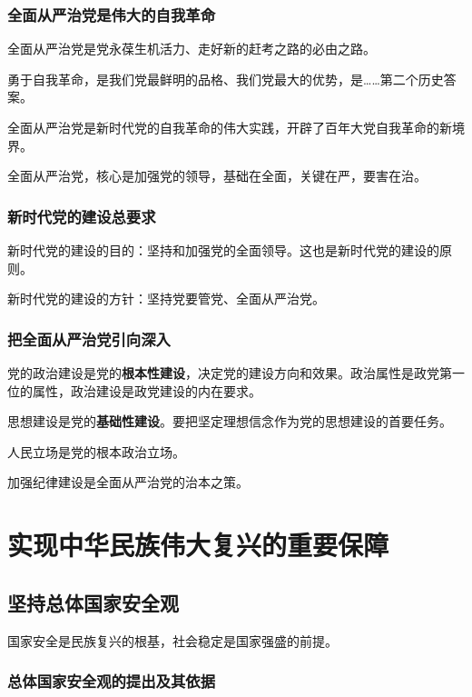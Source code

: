 \documentclass[12pt, a4paper, oneside]{ctexart}
\begin{document}
\subsubsection{全面从严治党是伟大的自我革命}

全面从严治党是党永葆生机活力、走好新的赶考之路的必由之路。

勇于自我革命，是我们党最鲜明的品格、我们党最大的优势，是……第二个历史答案。

全面从严治党是新时代党的自我革命的伟大实践，开辟了百年大党自我革命的新境界。

全面从严治党，核心是加强党的领导，基础在全面，关键在严，要害在治。

\subsubsection{新时代党的建设总要求}

新时代党的建设的目的：坚持和加强党的全面领导。这也是新时代党的建设的原则。

新时代党的建设的方针：坚持党要管党、全面从严治党。

\subsubsection{把全面从严治党引向深入}

党的政治建设是党的\textbf{根本性建设}，决定党的建设方向和效果。政治属性是政党第一位的属性，政治建设是政党建设的内在要求。

思想建设是党的\textbf{基础性建设}。要把坚定理想信念作为党的思想建设的首要任务。

人民立场是党的根本政治立场。

加强纪律建设是全面从严治党的治本之策。

\section{实现中华民族伟大复兴的重要保障}

\subsection{坚持总体国家安全观}

国家安全是民族复兴的根基，社会稳定是国家强盛的前提。

\subsubsection{总体国家安全观的提出及其依据}
\end{document}
